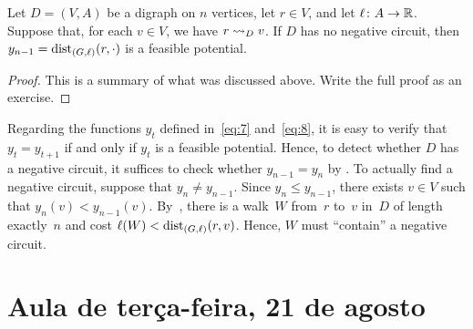 \documentclass[10pt,reqno]{amsart}
\begin{document}
\begin{corollary}
  \label{cor:1}
  Let \(D = (V,A)\) be a digraph on \(n\) vertices, let \(r \in V\),
  and let \(\ell \colon A \to \mathbb{R}\).  Suppose that, for each
  \(v \in V\), we have \(r \rightsquigarrow_D v\).  If \(D\) has no negative
  circuit, then \(y_{n-1} = \operatorname{dist}_{(G,\ell)}(r,\cdot)\) is a feasible
  potential.
\end{corollary}
\begin{proof}
  This is a summary of what was discussed above.  Write the full proof
  as an exercise.
\end{proof}

Regarding the functions \(y_t\) defined in~\eqref{eq:7}
and~\eqref{eq:8}, it is easy to verify that \(y_{t} = y_{t+1}\) if and
only if \(y_t\) is a feasible potential.  Hence, to detect whether
\(D\) has a negative circuit, it suffices to check whether
\(y_{n-1} = y_n\) by .  To actually find a negative
circuit, suppose that \(y_n \neq y_{n-1}\).  Since
\(y_n \leq y_{n-1}\), there exists \(v \in V\) such that
\(y_n(v) < y_{n-1}(v)\).  By~, there is a walk~\(W\)
from~\(r\) to~\(v\) in~\(D\) of length exactly~\(n\) and cost
\(\ell(W) < \operatorname{dist}_{(G,\ell)}(r,v)\).  Hence, \(W\) must ``contain'' a
negative circuit.

\section{Aula de terça-feira, 21 de agosto}
\end{document}
